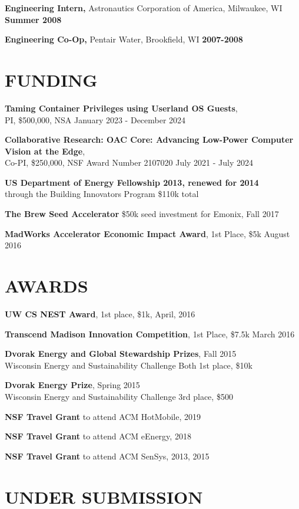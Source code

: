\documentclass{res}
\begin{document}
\begin{resume}
    {\bf Engineering Intern,} Astronautics Corporation of America, Milwaukee, WI
    \hfill \textbf{Summer 2008}

    {\bf Engineering Co-Op,} Pentair Water, Brookfield, WI 
    \hfill \textbf{2007-2008}
\fi
\section{FUNDING}

    {\bf Taming Container Privileges using Userland OS Guests}, \\
    PI, \$500,000, NSA January 2023 - December 2024 


    {\bf Collaborative Research: OAC Core: Advancing Low-Power Computer Vision at the Edge}, \\
    Co-PI, \$250,000, NSF Award Number 2107020 July 2021 - July 2024 
	
    {\bf US Department of Energy Fellowship 2013, renewed for 2014}\\
	through the Building Innovators Program
	\$110k total

	\textbf{The Brew Seed Accelerator} \$50k seed investment for Emonix, Fall 2017

	{\bf MadWorks Accelerator Economic Impact Award}, 1st Place, \$5k August 2016 

\section{AWARDS}


	{\bf UW CS NEST Award}, 1st place, \$1k,  April, 2016

	{\bf Transcend Madison Innovation Competition}, 1st Place, \$7.5k March 2016

	{\bf Dvorak Energy and Global Stewardship Prizes}, Fall 2015\\
	Wisconsin Energy and Sustainability Challenge
	Both 1st place, \$10k


	{\bf Dvorak Energy Prize}, Spring 2015\\
	Wisconsin Energy and Sustainability Challenge
	3rd place, \$500

	{\bf NSF Travel Grant} to attend ACM HotMobile, 2019

	{\bf NSF Travel Grant} to attend ACM eEnergy, 2018
	
    {\bf NSF Travel Grant} to attend ACM SenSys, 2013, 2015
\vfill\eject

\section{UNDER SUBMISSION}



\end{resume}
\end{document}
